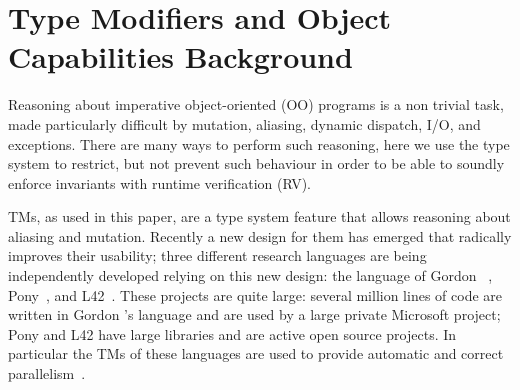 \section{Type Modifiers and Object Capabilities Background}
\label{s:TMsAndOCs}
Reasoning about imperative object-oriented (OO) programs is a non trivial task,
made particularly difficult by mutation, aliasing, dynamic dispatch, I/O, and exceptions. There are many ways to perform such reasoning, here we use the type system to restrict, but not prevent such behaviour in order to be able to soundly enforce invariants with runtime verification (RV).

TMs, as used in this paper, are a type system feature that allows reasoning about aliasing and mutation. Recently a new design for them has emerged that radically improves their usability;
three different research languages are being independently developed relying on this new design: the language of Gordon \etal~\cite{GordonEtAl12}, Pony~\cite{clebsch2015deny,clebsch2017orca}, and L42~\cite{ServettoZucca15,ServettoEtAl13a,JOT:issue_2011_01/article1,GianniniEtAl16}.
These projects are quite large: several million lines of code are written in Gordon \etal's language and are used by a large private Microsoft project; Pony and L42 have large libraries and are active open source projects. In particular the TMs of these languages are used to provide automatic and correct parallelism~\cite{GordonEtAl12,clebsch2015deny,clebsch2017orca,ServettoEtAl13a}.

